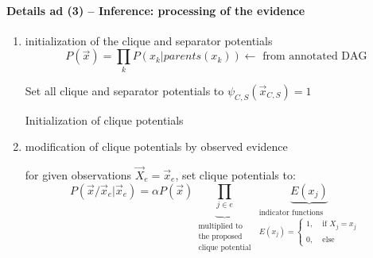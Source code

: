 \paragraph{Details ad (3) -- Inference: processing of the evidence}
\label{sec:infer-proc-evid}
\begin{enumerate}[-a-]
  \item initialization of the clique and separator potentials   
  \begin{equation}	
    P(\vec{x}) = \prod\limits_k P(x_k|parents(x_k)) 
    \leftarrow \text{ from annotated DAG}
  \end{equation}
   \begin{algorithm}
     \DontPrintSemicolon
     Set all clique and separator potentials to $\psi_{C,S}(\vec{x}_{C,S}) = 1$\;
     \caption{Initialization of clique potentials}
   \end{algorithm}

\item modification of clique potentials by observed evidence 
  \begin{itemize}
  \itr for given observations $\vec{X}_e = \vec{x}_e$, set clique potentials to:
  \begin{equation}
    P(\vec{x}/\vec{x}_e|\vec{x}_e) =
    \alpha P(\vec{x}) 
    \underbrace{\prod\limits_{j \in e}}_{
      \substack{\text{multiplied to} \\
        \text{the proposed} \\
        \text{clique potential}}}
    \underbrace{E(x_j)}_{\substack{\text{indicator
          functions}\\
        E(x_j) = \left\{ \begin{array}{ll}
            1, & \text{ if } X_j = x_j\\\\
            0, & \text{ else}
          \end{array} \right.}}
  \end{equation}
  \end{itemize}



\end{enumerate}
